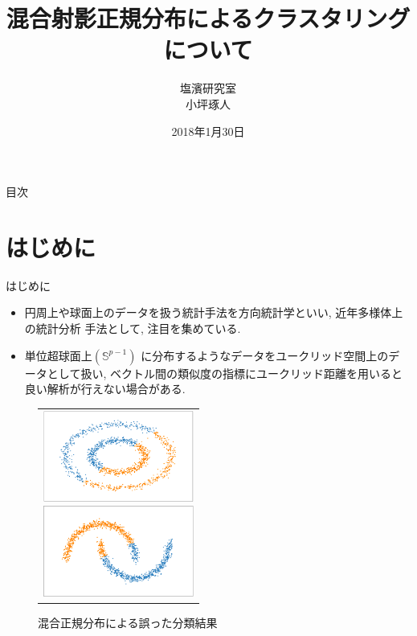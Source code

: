 \documentclass[dvipdfmx]{beamer} %
\title[タイトル]{混合射影正規分布によるクラスタリングについて}
\author[発表者名]{塩濱研究室\\ 小坪琢人}
\institute[所属]{東京理科大学\ 工学部経営工学科4年\\学籍番号 4414036}
\date[日付]{2018年1月30日}
\begin{document}
\begin{frame}[plain]
\titlepage
\end{frame}

\begin{frame}{目次}
\tableofcontents
\end{frame}

\section{はじめに}
\begin{frame}{はじめに}

\begin{itemize}

\item 
円周上や球面上のデータを扱う統計手法を方向統計学といい, 近年多様体上の統計分析
手法として, 注目を集めている.

\item 
単位超球面上$(\mathbb{S}^{p-1})$ に分布するようなデータをユークリッド空間上のデータとして扱い, ベクトル間の類似度の指標にユークリッド距離を用いると良い解析が行えない場合がある.

\end{itemize}

\begin{figure}[H]
 \begin{tabular}{c}
 \begin{minipage}{0.5\hsize}
  \begin{center}
   \includegraphics[clip,height= 30mm]{data/sample_mixture_miss2.png}
  \end{center}
 \end{minipage}
 \begin{minipage}{0.5\hsize}
  \begin{center}
 \includegraphics[clip,height= 30mm]{data/sample_mixture_miss1.png}
  \end{center}
 \end{minipage}
\end{tabular}
\caption{混合正規分布による誤った分類結果}
\end{figure}

\end{frame}
\end{document}
